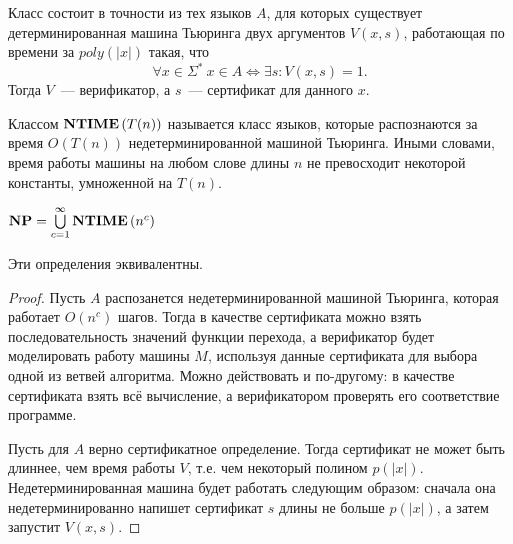 \begin{definition} Класс \np состоит в точности из тех языков $A$, для которых существует детерминированная машина Тьюринга двух аргументов $V(x, s)$, работающая по времени за $poly(|x|)$ такая, что
$$
\forall x \in \Sigma^* \ x \in A \Longleftrightarrow \exists s: V(x, s) = 1.
$$
Тогда $V$~--- верификатор, а $s$~--- сертификат для данного $x$.
\end{definition}

\begin{definition} Классом $\textbf{NTIME}\left({T(n)}\right)$ называется класс языков, которые распознаются за время $O(T(n))$ недетерминированной машиной Тьюринга. Иными словами, время работы машины на любом слове длины $n$ не превосходит некоторой константы, умноженной на $T(n)$.
\end{definition}

\begin{definition} $\textbf{NP} = \bigcup\limits_{c=1}^{\infty}\textbf{NTIME}\left({n^c}\right)$
\end{definition}

\begin{theorem}\label{th:eqvivNP}
Эти определения эквивалентны.
\end{theorem}
\begin{proof}

Пусть $A$ распозанется недетерминированной машиной Тьюринга, которая работает $O(n^c)$ шагов. Тогда в качестве сертификата можно взять последовательность значений функции перехода, а верификатор будет моделировать работу машины $M$, используя данные сертификата для выбора одной из ветвей алгоритма. Можно действовать и по-другому: в качестве сертификата взять всё
вычисление, а верификатором проверять его соответствие программе.

Пусть для $A$ верно сертификатное определение. Тогда сертификат не может быть длиннее, чем время работы $V$, т.е. чем некоторый полином $p(|x|)$. Недетерминированная машина будет работать следующим образом: сначала она недетерминированно напишет сертификат $s$ длины не больше $p(|x|)$, а затем запустит $V(x,s)$. 
\end{proof}